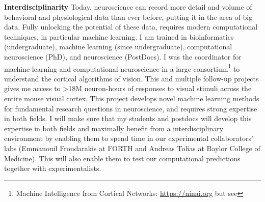 \documentclass[B2,COG]{ercgrant}
\begin{document}
\textbf{Interdisciplinarity} 
Today, neuroscience can record more detail and volume  of  behavioral and physiological data than ever before, putting it in the area of big data. 
Fully unlocking the potential of these data, requires modern computational techniques, in particular machine learning. 
I am trained in bioinformatics (undergraduate), machine learning (since undergraduate), computational neuroscience (PhD), and neuroscience (PostDocs).
I was the coordinator for machine learning and computational neuroscience in a large consortium\footnote{Machine Intelligence from Cortical Networks: \url{https://ninai.org} but see } to understand the cortical algorithms of vision.
This and multiple follow-up projects gives me access to >18M neuron-hours of responses to visual stimuli across the entire mouse visual cortex. 
This project develops novel machine learning methods for fundamental research questions in neuroscience, and requires strong expertise in both fields. 
I will make sure that my students and postdocs will develop this expertise in both fields and maximally benefit from a interdisciplinary environment by enabling them to spend time in our experimental collaborators’ labs (Emmanouil Froudarakis at FORTH and Andreas Tolias at Baylor College of Medicine).
This will also enable them to test our computational predictions together with experimentalists.
\end{document}
